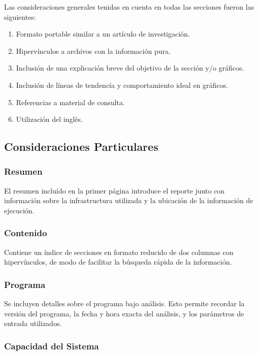 \documentclass[a4paper]{report}
\begin{document}
Las consideraciones generales tenidas en cuenta en todas las secciones fueron las siguientes:


\begin{enumerate}
\item Formato portable similar a un artículo de investigación.
\item Hipervínculos a archivos con la información pura.
\item Inclusión de una explicación breve del objetivo de la sección y/o gráficos.
\item Inclusión de líneas de tendencía y comportamiento ideal en gráficos.
\item Referencias a material de consulta.
\item Utilización del inglés.
\end{enumerate}

\subsection{Consideraciones Particulares}

\subsubsection{Resumen}

El resumen incluído en la primer página introduce el reporte junto con información sobre la infrastructura utilizada y la ubicación de la información de ejecución.

\subsubsection{Contenido}

Contiene un índice de secciones en formato reducido de dos columnas con hipervínculos, de modo de facilitar la búsqueda rápida de la información.

\subsubsection{Programa}

Se incluyen detalles sobre el programa bajo análisis. Esto permite recordar la versión del programa, la fecha y hora exacta del análisis, y los parámetros de entrada utilizados.

\subsubsection{Capacidad del Sistema}
\end{document}
